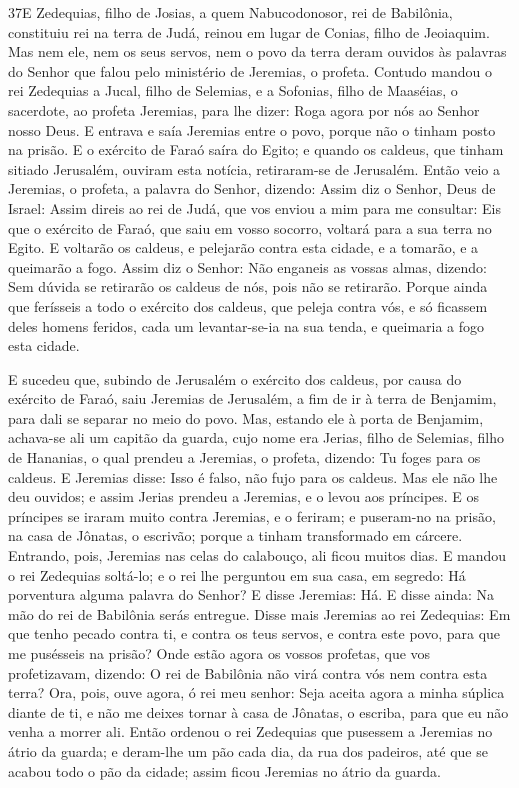 \lettrine{37} E Zedequias, filho de Josias, a quem
Nabucodonosor, rei de Babilônia, constituiu rei na terra de Judá,
reinou em lugar de Conias, filho de Jeoiaquim. Mas nem ele, nem
os seus servos, nem o povo da terra deram ouvidos às palavras do
Senhor que falou pelo ministério de Jeremias, o profeta. Contudo
mandou o rei Zedequias a Jucal, filho de Selemias, e a Sofonias,
filho de Maaséias, o sacerdote, ao profeta Jeremias, para lhe dizer:
Roga agora por nós ao Senhor nosso Deus. E entrava e saía
Jeremias entre o povo, porque não o tinham posto na prisão. E o
exército de Faraó saíra do Egito; e quando os caldeus, que tinham
sitiado Jerusalém, ouviram esta notícia, retiraram-se de Jerusalém.
Então veio a Jeremias, o profeta, a palavra do Senhor, dizendo:
Assim diz o Senhor, Deus de Israel: Assim direis ao rei de Judá,
que vos enviou a mim para me consultar: Eis que o exército de Faraó,
que saiu em vosso socorro, voltará para a sua terra no Egito. E
voltarão os caldeus, e pelejarão contra esta cidade, e a tomarão, e
a queimarão a fogo. Assim diz o Senhor: Não enganeis as vossas
almas, dizendo: Sem dúvida se retirarão os caldeus de nós, pois não
se retirarão. Porque ainda que ferísseis a todo o exército
dos caldeus, que peleja contra vós, e só ficassem deles homens
feridos, cada um levantar-se-ia na sua tenda, e queimaria a fogo
esta cidade.

E sucedeu que, subindo de Jerusalém o exército dos caldeus, por
causa do exército de Faraó, saiu Jeremias de Jerusalém, a fim
de ir à terra de Benjamim, para dali se separar no meio do povo.
Mas, estando ele à porta de Benjamim, achava-se ali um
capitão da guarda, cujo nome era Jerias, filho de Selemias, filho de
Hananias, o qual prendeu a Jeremias, o profeta, dizendo: Tu foges
para os caldeus. E Jeremias disse: Isso é falso, não fujo
para os caldeus. Mas ele não lhe deu ouvidos; e assim Jerias prendeu
a Jeremias, e o levou aos príncipes. E os príncipes se iraram
muito contra Jeremias, e o feriram; e puseram-no na prisão, na casa
de Jônatas, o escrivão; porque a tinham transformado em cárcere.
Entrando, pois, Jeremias nas celas do calabouço, ali ficou
muitos dias. E mandou o rei Zedequias soltá-lo; e o rei lhe
perguntou em sua casa, em segredo: Há porventura alguma palavra do
Senhor? E disse Jeremias: Há. E disse ainda: Na mão do rei de
Babilônia serás entregue. Disse mais Jeremias ao rei
Zedequias: Em que tenho pecado contra ti, e contra os teus servos, e
contra este povo, para que me pusésseis na prisão? Onde estão
agora os vossos profetas, que vos profetizavam, dizendo: O rei de
Babilônia não virá contra vós nem contra esta terra? Ora,
pois, ouve agora, ó rei meu senhor: Seja aceita agora a minha
súplica diante de ti, e não me deixes tornar à casa de Jônatas, o
escriba, para que eu não venha a morrer ali. Então ordenou o
rei Zedequias que pusessem a Jeremias no átrio da guarda; e
deram-lhe um pão cada dia, da rua dos padeiros, até que se acabou
todo o pão da cidade; assim ficou Jeremias no átrio da guarda.

